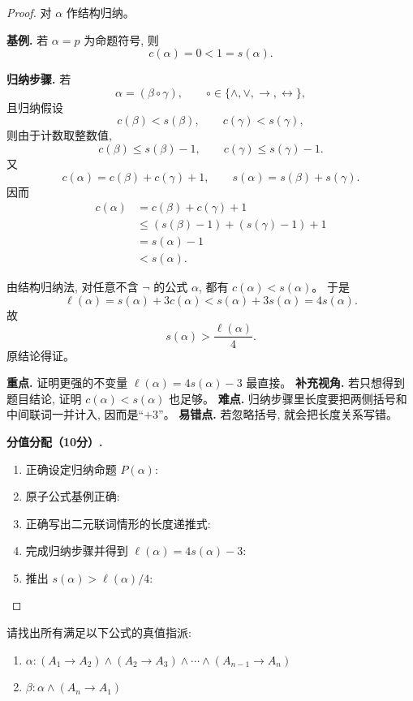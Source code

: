\documentclass[a4paper, justified]{tufte-handout}
\begin{document}
\begin{proof}
  对 $\alpha$ 作结构归纳。

  \textbf{基例.}
  若 $\alpha = p$ 为命题符号, 则
  \[
    c(\alpha) = 0 < 1 = s(\alpha).
  \]

  \textbf{归纳步骤.}
  若
  \[
    \alpha = (\beta \circ \gamma),
    \qquad
    \circ \in \{\land, \lor, \to, \leftrightarrow\},
  \]
  且归纳假设
  \[
    c(\beta) < s(\beta),
    \qquad
    c(\gamma) < s(\gamma),
  \]
  则由于计数取整数值,
  \[
    c(\beta) \le s(\beta) - 1,
    \qquad
    c(\gamma) \le s(\gamma) - 1.
  \]
  又
  \[
    c(\alpha) = c(\beta) + c(\gamma) + 1,
    \qquad
    s(\alpha) = s(\beta) + s(\gamma).
  \]
  因而
  \begin{align*}
    c(\alpha)
      &= c(\beta) + c(\gamma) + 1 \\
      &\le (s(\beta) - 1) + (s(\gamma) - 1) + 1 \\
      &= s(\alpha) - 1 \\
      &< s(\alpha).
  \end{align*}

  由结构归纳法, 对任意不含 $\lnot$ 的公式 $\alpha$,
  都有 $c(\alpha) < s(\alpha)$。
  于是
  \[
    \ell(\alpha) = s(\alpha) + 3 c(\alpha)
    < s(\alpha) + 3 s(\alpha)
    = 4 s(\alpha).
  \]
  故
  \[
    s(\alpha) > \frac{\ell(\alpha)}{4}.
  \]
  原结论得证。

  \begin{remark}
    \textbf{重点.} 证明更强的不变量 $\ell(\alpha) = 4 s(\alpha) - 3$ 最直接。
    \textbf{补充视角.} 若只想得到题目结论, 证明 $c(\alpha) < s(\alpha)$ 也足够。
    \textbf{难点.} 归纳步骤里长度要把两侧括号和中间联词一并计入, 因而是“$+3$”。
    \textbf{易错点.} 若忽略括号, 就会把长度关系写错。
  \end{remark}

  \textbf{分值分配（10分）.}
  \begin{enumerate}[(1)]
    \item 正确设定归纳命题 $P(\alpha)$: 
    \item 原子公式基例正确: 
    \item 正确写出二元联词情形的长度递推式: 
    \item 完成归纳步骤并得到 $\ell(\alpha) = 4 s(\alpha) - 3$: 
    \item 推出 $s(\alpha) > \ell(\alpha)/4$: 
  \end{enumerate}
\end{proof}

\newpage
\begin{problem}[命题逻辑公式的语义]
  请找出所有满足以下公式的真值指派:
  \begin{enumerate}[(1)]
    \item $\alpha: (A_{1} \to A_{2}) \land (A_{2} \to A_{3})
      \land \cdots \land (A_{n-1} \to A_{n})$
    \item $\beta: \alpha \land (A_{n} \to A_{1})$
  \end{enumerate}
\end{problem}
\end{document}

